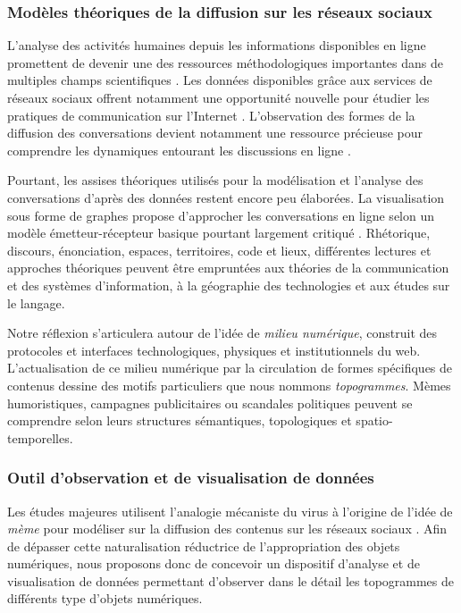 \subsubsection{Modèles théoriques de la diffusion sur les réseaux sociaux}

L'analyse des activités humaines depuis les informations disponibles en ligne promettent de devenir une des ressources méthodologiques importantes dans de multiples champs scientifiques \citep{Schreibman2007, Guichard2014}. Les données disponibles grâce aux services de réseaux sociaux offrent notamment une opportunité nouvelle pour étudier les pratiques de communication sur l'Internet \citep{Zook2007,Nettleton2013,Manovich2011}. L'observation des formes de la diffusion des conversations devient notamment une ressource précieuse pour comprendre les dynamiques entourant les discussions en ligne \citep{Conover2013,Leetaru2013}.
 
Pourtant, les assises théoriques utilisés pour la modélisation et l'analyse des conversations d'après des données restent encore peu élaborées. La visualisation sous forme de graphes propose d'approcher les conversations en ligne selon un modèle émetteur-récepteur basique pourtant largement critiqué \citep{Proulx2000}. Rhétorique, discours, énonciation, espaces, territoires, code et lieux, différentes lectures et approches théoriques peuvent être empruntées aux théories de la communication et des systèmes d'information, à la géographie des technologies et aux études sur le langage.

Notre réflexion s'articulera autour de l'idée de \textit{milieu numérique}, construit des protocoles et interfaces technologiques, physiques et institutionnels du web. L'actualisation de ce milieu numérique par la circulation de formes spécifiques de contenus dessine des motifs particuliers que nous nommons \textit{topogrammes}. Mèmes humoristiques, campagnes publicitaires ou scandales politiques peuvent se comprendre selon leurs structures sémantiques, topologiques et spatio-temporelles.

\subsubsection{Outil d'observation et de visualisation de données}

Les études majeures utilisent l'analogie mécaniste du virus à l'origine de l'idée de \textit{mème} \cite{Dawkins1989, Blackmore2001} pour modéliser sur la diffusion des contenus sur les réseaux sociaux \cite{Leskovec2005, Adamic2014}. Afin de dépasser cette naturalisation réductrice de l'appropriation des objets numériques, nous proposons donc de concevoir un dispositif d'analyse et de visualisation de données permettant d'observer dans le détail les topogrammes de différents type d'objets numériques. 

